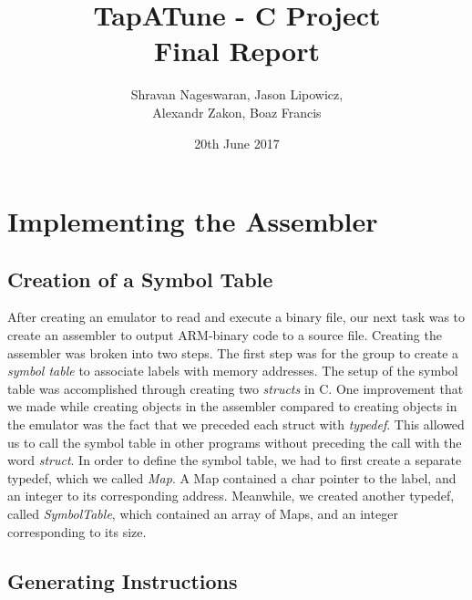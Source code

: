 \documentclass[11pt]{article}
\begin{document}
\title{\textbf{TapATune - C Project \\Final Report}}
\author{Shravan Nageswaran, Jason Lipowicz,\\ Alexandr Zakon, Boaz Francis}
\date{20th June 2017}

\maketitle

\vspace{0.2in}

\section{Implementing the Assembler}

\subsection{Creation of a Symbol Table}

After creating an emulator to read and execute a binary file, our next task was to create an assembler to output ARM-binary code to a source file. Creating the assembler was broken into two steps. The first step was for the group to create a \emph{symbol table} to associate labels with memory addresses. The setup of the symbol table was accomplished through creating two \emph{structs} in C. One improvement that we made while creating objects in the assembler compared to creating objects in the emulator was the fact that we preceded each struct with \emph{typedef}. This allowed us to call the symbol table in other programs without preceding the call with the word \emph{struct}. In order to define the symbol table, we had to first create a separate typedef, which we called \emph{Map}. A Map contained a char pointer to the label, and an integer to its corresponding address. Meanwhile, we created another typedef, called \emph{SymbolTable}, which contained an array of Maps, and an integer corresponding to its size.

\subsection{Generating Instructions}
\end{document}
